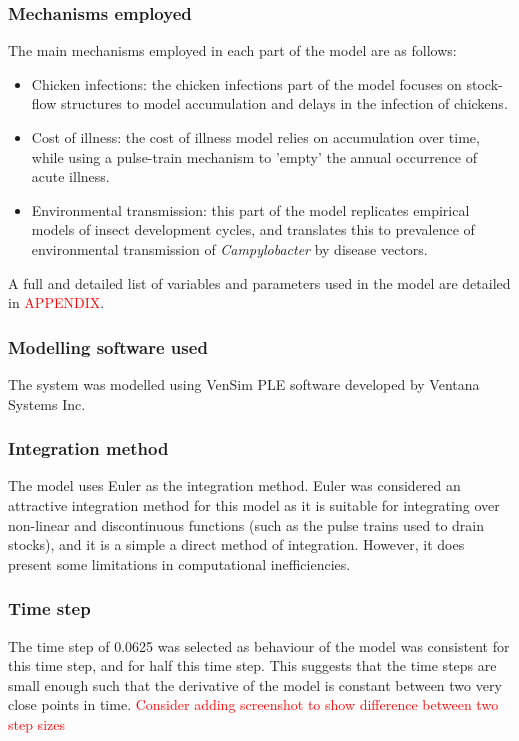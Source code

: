 \subsubsection{Mechanisms employed}
The main mechanisms employed in each part of the model are as follows:
\begin{itemize}
    \item Chicken infections: the chicken infections part of the model focuses on stock-flow structures to model accumulation and delays in the infection of chickens.
    \item Cost of illness: the cost of illness model relies on accumulation over time, while using a pulse-train mechanism to 'empty' the annual occurrence of acute illness.
    \item Environmental transmission: this part of the model replicates empirical models of insect development cycles, and translates this to prevalence of environmental transmission of \textit{Campylobacter} by disease vectors.
\end{itemize}

A full and detailed list of variables and parameters used in the model are detailed in \textcolor{red}{APPENDIX}.
\subsubsection{Modelling software used}
The system was modelled using VenSim PLE software developed by Ventana Systems Inc.
    
\subsubsection{Integration method}
The model uses Euler as the integration method. Euler was considered an attractive integration method for this model as it is suitable for integrating over non-linear and discontinuous functions (such as the pulse trains used to drain stocks), and it is a simple a direct method of integration. However, it does present some limitations in computational inefficiencies.

\subsubsection{Time step}
The time step of 0.0625 was selected as behaviour of the model was consistent for this time step, and for half this time step. This suggests that the time steps are small enough such that the derivative of the model is constant between two very close points in time.
\textcolor{red}{Consider adding screenshot to show difference between two step sizes}

